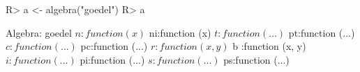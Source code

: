 \begin{Schunk}
% --begin: "goedel.algebra"
\begin{Sinput}
R> a <- algebra("goedel")
R> a
\end{Sinput}
\begin{Soutput}
Algebra: goedel 
 $ n :function (x)  
 $ ni:function (x)  
 $ t :function (...)  
 $ pt:function (...)  
 $ c :function (...)  
 $ pc:function (...)  
 $ r :function (x, y)  
 $ b :function (x, y)  
 $ i :function (...)  
 $ pi:function (...)  
 $ s :function (...)  
 $ ps:function (...)  
\end{Soutput}
% --end: "goedel.algebra"
\end{Schunk}
